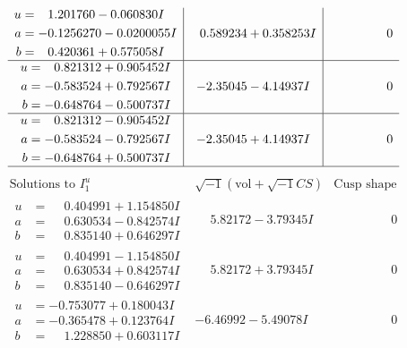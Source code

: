 \documentclass[1p]{elsarticle_modified}
\theoremstyle{definition}
\newcommand{\I}{\sqrt{-1}}
\begin{document}
$$\begin{array}{c|c|c}
\begin{aligned}
u &= \phantom{-}1.201760 - 0.060830 I \\
a &= -0.1256270 - 0.0200055 I \\
b &= \phantom{-}0.420361 + 0.575058 I\end{aligned}
 & \phantom{-}0.589234 + 0.358253 I & \phantom{-0.000000 } 0 \\ \hline\begin{aligned}
u &= \phantom{-}0.821312 + 0.905452 I \\
a &= -0.583524 + 0.792567 I \\
b &= -0.648764 - 0.500737 I\end{aligned}
 & -2.35045 - 4.14937 I & \phantom{-0.000000 } 0 \\ \hline\begin{aligned}
u &= \phantom{-}0.821312 - 0.905452 I \\
a &= -0.583524 - 0.792567 I \\
b &= -0.648764 + 0.500737 I\end{aligned}
 & -2.35045 + 4.14937 I & \phantom{-0.000000 } 0\\
 \hline 
 \end{array}$$\newpage$$\begin{array}{c|c|c}  
\text{Solutions to }I^u_{1}& \I (\text{vol} + \sqrt{-1}CS) & \text{Cusp shape}\\
 \hline 
\begin{aligned}
u &= \phantom{-}0.404991 + 1.154850 I \\
a &= \phantom{-}0.630534 - 0.842574 I \\
b &= \phantom{-}0.835140 + 0.646297 I\end{aligned}
 & \phantom{-}5.82172 - 3.79345 I & \phantom{-0.000000 } 0 \\ \hline\begin{aligned}
u &= \phantom{-}0.404991 - 1.154850 I \\
a &= \phantom{-}0.630534 + 0.842574 I \\
b &= \phantom{-}0.835140 - 0.646297 I\end{aligned}
 & \phantom{-}5.82172 + 3.79345 I & \phantom{-0.000000 } 0 \\ \hline\begin{aligned}
u &= -0.753077 + 0.180043 I \\
a &= -0.365478 + 0.123764 I \\
b &= \phantom{-}1.228850 + 0.603117 I\end{aligned}
 & -6.46992 - 5.49078 I & \phantom{-0.000000 } 0 \\ \hline\begin{aligned}

\end{aligned}
\end{array}$$
\end{document}
